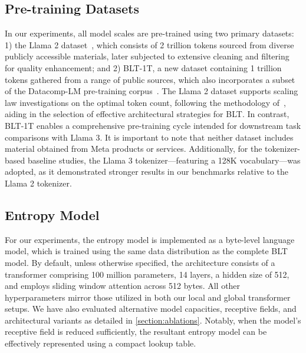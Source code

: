 \subsection{Pre-training Datasets} In our experiments, all model scales are pre-trained using two primary datasets: 1) the Llama 2 dataset~\citep{touvron2023llama}, which consists of 2 trillion tokens sourced from diverse publicly accessible materials, later subjected to extensive cleaning and filtering for quality enhancement; and 2) {\textsc BLT}-1T, a new dataset containing 1 trillion tokens gathered from a range of public sources, which also incorporates a subset of the Datacomp-LM pre-training corpus~\citep{li2024datacomp}. The Llama 2 dataset supports scaling law investigations on the optimal token count, following the methodology of~\cite{dubey2024llama}, aiding in the selection of effective architectural strategies for {\textsc BLT}. In contrast, {\textsc BLT}-1T enables a comprehensive pre-training cycle intended for downstream task comparisons with Llama 3. It is important to note that neither dataset includes material obtained from Meta products or services. Additionally, for the tokenizer-based baseline studies, the Llama 3 tokenizer—featuring a 128K vocabulary—was adopted, as it demonstrated stronger results in our benchmarks relative to the Llama 2 tokenizer.

\subsection{Entropy Model} For our experiments, the entropy model is implemented as a byte-level language model, which is trained using the same data distribution as the complete {\textsc BLT} model. By default, unless otherwise specified, the architecture consists of a transformer comprising 100 million parameters, 14 layers, a hidden size of 512, and employs sliding window attention across 512 bytes. All other hyperparameters mirror those utilized in both our local and global transformer setups. We have also evaluated alternative model capacities, receptive fields, and architectural variants as detailed in \autoref{section:ablations}. Notably, when the model's receptive field is reduced sufficiently, the resultant entropy model can be effectively represented using a compact lookup table.

